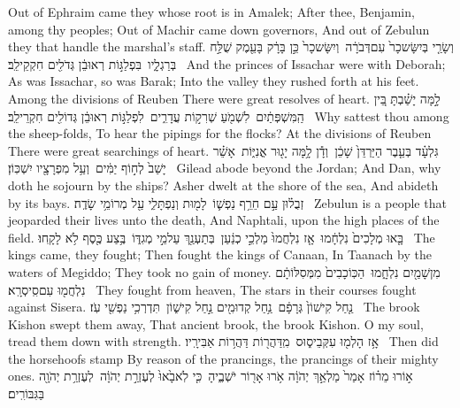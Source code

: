 {Out of Ephraim came they whose root is in Amalek; After thee, Benjamin, among thy peoples; Out of Machir came down governors, And out of Zebulun they that handle the marshal’s staff.}
{וְשָׂרַ֤י בְּיִשָּׂשכָר֙ עִם\maqqaf דְּבֹרָ֔ה \setuma  וְיִשָּׂשכָר֙ כֵּ֣ן בָּרָ֔ק בָּעֵ֖מֶק שֻׁלַּ֣ח בְּרַגְלָ֑יו \setuma  בִּפְלַגּ֣וֹת רְאוּבֵ֔ן גְּדֹלִ֖ים חִקְקֵי\maqqaf לֵֽב׃ \setuma }
{And the princes of Issachar were with Deborah; As was Issachar, so was Barak; Into the valley they rushed forth at his feet. Among the divisions of Reuben There were great resolves of heart.}
{לָ֣מָּה יָשַׁ֗בְתָּ בֵּ֚ין הַֽמִּשְׁפְּתַ֔יִם \setuma  לִשְׁמֹ֖עַ שְׁרִק֣וֹת עֲדָרִ֑ים \setuma  לִפְלַגּ֣וֹת רְאוּבֵ֔ן גְּדוֹלִ֖ים חִקְרֵי\maqqaf לֵֽב׃ \setuma }
{Why sattest thou among the sheep-folds, To hear the pipings for the flocks? At the divisions of Reuben There were great searchings of heart.}
{גִּלְעָ֗ד בְּעֵ֤בֶר הַיַּרְדֵּן֙ שָׁכֵ֔ן \setuma  וְדָ֕ן לָ֥מָּה יָג֖וּר אֳנִיּ֑וֹת \setuma  אָשֵׁ֗ר יָשַׁב֙ לְח֣וֹף יַמִּ֔ים \setuma  וְעַ֥ל מִפְרָצָ֖יו יִשְׁכּֽוֹן׃ \setuma }
{Gilead abode beyond the Jordan; And Dan, why doth he sojourn by the ships? Asher dwelt at the shore of the sea, And abideth by its bays.}
{זְבֻל֗וּן עַ֣ם חֵרֵ֥ף נַפְשׁ֛וֹ \setuma  לָמ֖וּת וְנַפְתָּלִ֑י עַ֖ל מְרוֹמֵ֥י שָׂדֶֽה׃ \setuma }
{Zebulun is a people that jeoparded their lives unto the death, And Naphtali, upon the high places of the field.}
{בָּ֤אוּ מְלָכִים֙ נִלְחָ֔מוּ \setuma  אָ֤ז נִלְחֲמוּ֙ מַלְכֵ֣י כְנַ֔עַן \setuma  בְּתַעְנַ֖ךְ עַל\maqqaf מֵ֣י מְגִדּ֑וֹ \setuma  בֶּ֥צַע כֶּ֖סֶף לֹ֥א לָקָֽחוּ׃ \setuma }
{The kings came, they fought; Then fought the kings of Canaan, In Taanach by the waters of Megiddo; They took no gain of money.}
{מִן\maqqaf שָׁמַ֖יִם נִלְחָ֑מוּ \setuma  הַכּֽוֹכָבִים֙ מִמְּסִלּוֹתָ֔ם נִלְחֲמ֖וּ עִם\maqqaf סִֽיסְרָֽא׃ \setuma }
{They fought from heaven, The stars in their courses fought against Sisera.}
{נַ֤חַל קִישׁוֹן֙ גְּרָפָ֔ם \setuma  נַ֥חַל קְדוּמִ֖ים נַ֣חַל קִישׁ֑וֹן \setuma  תִּדְרְכִ֥י נַפְשִׁ֖י עֹֽז׃ \setuma }
{The brook Kishon swept them away, That ancient brook, the brook Kishon. O my soul, tread them down with strength.}
{אָ֥ז הָלְמ֖וּ עִקְּבֵי\maqqaf ס֑וּס \setuma  מִֽדַּהֲר֖וֹת דַּהֲר֥וֹת אַבִּירָֽיו׃ \setuma }
{Then did the horsehoofs stamp By reason of the prancings, the prancings of their mighty ones.}
{א֣וֹרוּ מֵר֗וֹז אָמַר֙ מַלְאַ֣ךְ יְהֹוָ֔ה אֹ֥רוּ אָר֖וֹר יֹשְׁבֶ֑יהָ \setuma  כִּ֤י לֹֽא\maqqaf בָ֙אוּ֙ לְעֶזְרַ֣ת יְהֹוָ֔ה \setuma  לְעֶזְרַ֥ת יְהֹוָ֖ה בַּגִּבּוֹרִֽים׃ \setuma }
